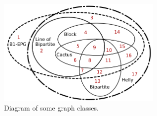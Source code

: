  \begin{figure}[htb]	
 \center%
 \includegraphics[width=8cm]{./img/diagram.png}
 \caption{Diagram of some graph classes.}
\label{fig:diagram}
\end{figure}  
 
